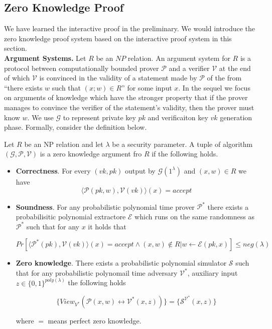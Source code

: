 
\subsection{Zero Knowledge Proof}\label{ZKP}

We have learned the interactive proof in the preliminary. We would introduce the zero knowledge proof system based on the interactive proof system in this section.\\

\noindent
\textbf{Argument Systems.} Let $R$ be an $NP$ relation. An argument system for $R$ is a protocol between
computationally bounded prover $\mathcal{P}$ and a verifier $\mathcal{V}$ at the end of which $\mathcal{V}$ is convinced in the validity of a statement made by $\mathcal{P}$ of the from “there exists $w$ such that $(x; w) \in R$” for some input $x$. In the sequel we focus on arguments of knowledge which have the stronger property that if the prover manages to convince
the verifier of the statement’s validity, then the prover must know $w$. We use $\mathcal{G}$ to represent private key $pk$ and verificaiton key $vk$ generation phase. Formally, consider the definition below.

\begin{definition}\label{def::zkpd}

Let $R$ be an NP relation and let $\lambda$ be a security parameter. A tuple of algorithm $(\mathcal{G}, \mathcal{P}, \mathcal{V})$ is a zero knowledge argument fro $R$ if the following holds.

\begin{itemize}

\item \textbf{Correctness}. For every $(vk, pk)$ output by $\mathcal{G}(1^\lambda)$ and $(x, w) \in R$ we have
$$\langle \mathcal{P}(pk, w), \mathcal{V}(vk) \rangle(x) = accept$$

\item \textbf{Soundness}. For any probabilistic polynomial time prover $\mathcal{P^*}$ there exists a probabilisitic polynomial extractore $\mathcal{E}$ which runs on the same randomness as $\mathcal{P^*}$ such that for any $x$ it holds that

$$Pr[\langle\mathcal{P^*}(pk), \mathcal{V}(vk) \rangle(x) = accept \wedge (x, w) \notin R | w \leftarrow \mathcal{E}(pk, x)] \leq neg(\lambda)$$

\item \textbf{Zero knowledge}. There exists a probabilistic polynomial simulator $\mathcal{S}$ such that for any probabilistic polynomail time adversary $\mathcal{V^*}$, auxiliary input $z \in \{0, 1\}^{poly(\lambda)}$ the following holds

$$\{View_{V^*}(\mathcal{P}(x, w) \leftrightarrow \mathcal{V^*}(x, z))\} = \{\mathcal{S}^{\mathcal{V^*}}(x, z)\}$$

where $=$ means perfect zero knowledge. 

\end{itemize}

\end{definition}